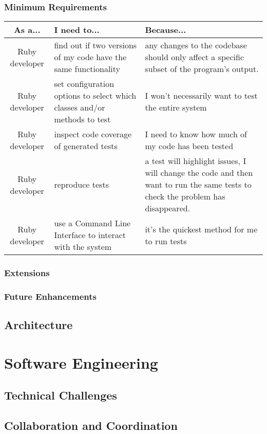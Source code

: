 \documentclass{report}
\begin{document}
\subsection{Minimum Requirements}
\begin{tabular}{| c | p{5cm} | p{5cm} |}
\hline
\textbf{As a...} & \textbf{I need to...} & \textbf{Because...} \\
\hline
Ruby developer & find out if two versions of my code have the same functionality & any changes to the codebase should only affect a specific subset of the program’s output. \\
\hline
Ruby developer & set configuration options to select which classes and/or methods to test & I won't necessarily want to test the entire system \\
\hline
Ruby developer & inspect code coverage of generated tests & I need to know how much of my code has been tested \\
\hline
Ruby developer & reproduce tests & a test will highlight issues, I will change the code and then want to run the same tests to check the problem has disappeared. \\
\hline
Ruby developer & use a Command Line Interface to interact with the system & it's the quickest method for me to run tests \\
\hline
\end{tabular}
\subsection{Extensions}
\subsection{Future Enhancements}

\section{Architecture}


\chapter{Software Engineering}
\section{Technical Challenges}
\section{Collaboration and Coordination}
\end{document}
